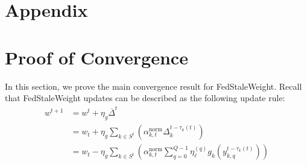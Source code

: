 \documentclass{article}
\begin{document}

\newpage

\appendix

\section*{Appendix}


\section{Proof of Convergence} \label{appendix:proof-of-convergence}
In this section, we prove the main convergence result for FedStaleWeight. Recall that FedStaleWeight updates can be described as the following update rule:
\begin{align*}
    w^{t+1} &= w^t + \eta_g \overline{\Delta}^t \\
    &= w_t + \eta_g \sum_{k \in S^t}\left( \alpha^{\text{norm}}_{k, t} \Delta_k^{t - \tau_k(t)}\right)
    \\
    &= w_t - \eta_g \sum_{k \in S^t}\left( \alpha^{\text{norm}}_{k, t} \sum_{q=0}^{Q-1} {\eta_\ell^{(q)} g_k \left(y_{k, q}^{t-\tau_k(t)}\right)}\right)
\end{align*}
\end{document}
